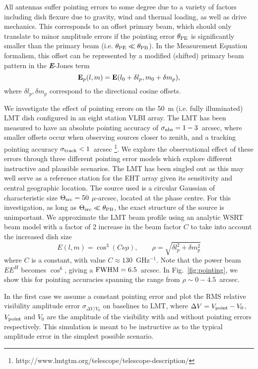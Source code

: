 All antennas suffer pointing errors to some degree due to a variety of factors including dish flexure due to gravity, wind and thermal loading, as well as drive mechanics. This corresponds to an offset primary beam, which should only translate to minor amplitude errors if the pointing error $\theta_{\rm PE}$ is significantly smaller than the primary beam (i.e. $\theta_{\rm PE} \ll \theta_{\rm PB}$). In the Measurement Equation formalism, this offset can be represented by a modified (shifted) primary beam pattern in the {\bf \it E}-Jones term 
\begin{equation}
{\bf E}_p(l,m) = {\bf E}(l_0 + \delta l_p, m_0 + \delta m_p),
\end{equation}
where $\delta l_p, \delta m_p$ correspond to the directional cosine offsets.


We investigate the effect of pointing errors on the 50~m (i.e. fully illuminated) LMT dish configured in an eight station VLBI array. The LMT has been measured to have an absolute pointing accuracy of $\sigma_{\rm abs} = 1-3$~arcsec, where smaller offsets occur when observing sources closer to zenith, and a tracking pointing accuracy $\sigma_{\rm track} < 1$~arcsec \footnote{http://www.lmtgtm.org/telescope/telescope-description/}. We explore the observational effect of these errors through three different pointing error models which explore different instructive and plausible scenarios. The LMT has been singled out as this may well serve as a reference station for the EHT array given its sensitivity and central geographic location. The source used is a circular Gaussian of characteristic size $\Theta_{\rm src}=50$ $\mu$-arcsec, located at the phase centre. For this investigation, as long as $\Theta_{\rm src} \ll \theta_{\rm PB}$, the exact structure of the source is unimportant. We approximate the LMT beam profile using an analytic WSRT beam model \citep{Popping_2008} with a factor of 2 increase in the beam factor $C$ to take into account the increased dish size
\begin{equation}
E(l, m) = \cos^3(C\nu \rho),\qquad   \rho = \sqrt{\delta l_p^2 + \delta m_p^2}
\end{equation}
where $C$ is a constant, with value $C \approx 130$~GHz$^{-1}$. Note that the power beam $EE^H$ becomes $\cos^6$, giving a $\rm{FWHM} = 6.5 $~arcsec. In Fig.~\ref{fig:pointing}, we show this for pointing accuracies spanning the range from $\rho \sim 0-4.5$~arcsec. 

In the first case we assume a constant pointing error and plot the RMS relative visibility amplitude error $\sigma_{\Delta V/V_0}$ on baselines to LMT, where $\Delta V = V_{\rm point} - V_{0}$, $V_{\rm point}$ and $V_{0}$ are the amplitude of the visibility with and without pointing errors respectively. This simulation is meant to be instructive as to the typical amplitude error in the simplest possible scenario.


